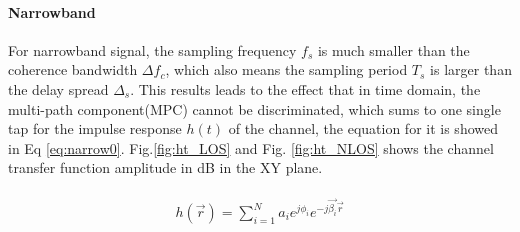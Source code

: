 \documentclass[a4paper]{article}
\begin{document}
	\paragraph{Narrowband} For narrowband signal, the sampling frequency $f_s$ is much smaller than the coherence bandwidth $\Delta f_c$, which also means the sampling period $T_s$ is larger than the delay spread $\Delta_s$. This results leads to the effect that in time domain, the multi-path component(MPC) cannot be discriminated, which sums to one single tap for the impulse response $h(t)$ of the channel, the equation for it is showed in Eq \ref{eq:narrow0}. Fig.\ref{fig:ht_LOS} and Fig. \ref{fig:ht_NLOS} shows the channel transfer function amplitude in dB in the XY plane.
	
	\begin{align} 
		\begin{split}
			h(\vec{r}) = \sum_{i=1}^{N} a_i e^{j\phi_i}e^{-j\vec{\beta_i}\vec{r}}
		\end{split}
		\label{eq:narrow0}
	\end{align}
	
\end{document}
